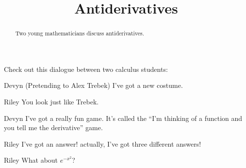 \documentclass{ximera}
\title[Break-Ground:]{Antiderivatives}
\begin{document}
\begin{abstract}
  Two young mathematicians discuss antiderivatives.
\end{abstract}
\maketitle

Check out this dialogue between two calculus students:


\begin{dialogue}
\item[Devyn] (Pretending to Alex Trebek) I've got a new costume.
\item[Riley] You look just like Trebek.
\item[Devyn] I've got a really fun game.  It's called the ``I'm thinking of a function and you tell me the derivative'' game.
\item[Riley] I've got an answer!  actually, I've got three different answers!
\item[Riley] What about $e^{-x^2}$?
\end{dialogue}


\end{document}

